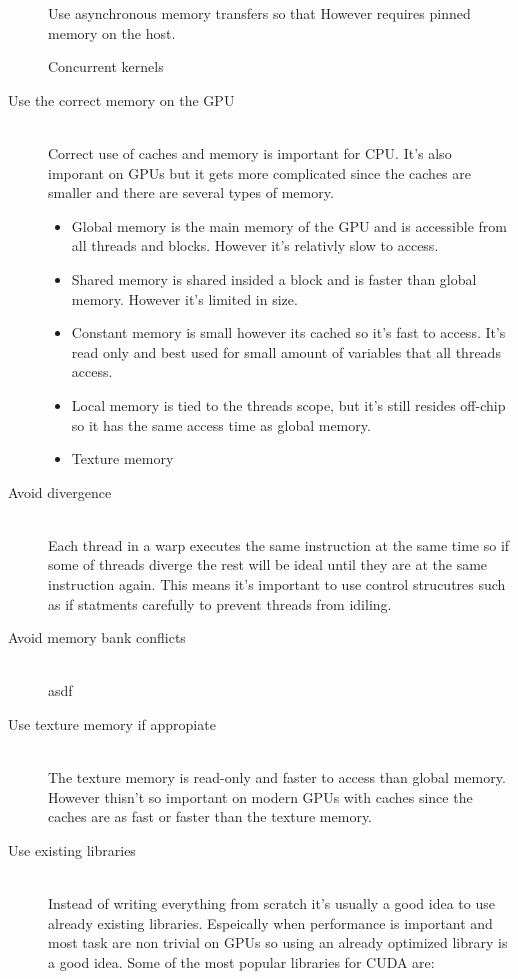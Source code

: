 \documentclass[10pt,a4paper]{article}
\begin{document}
\begin{description}
  Use asynchronous memory transfers so that
  However requires pinned memory on the host.
  
  Concurrent kernels
  
  
  
  \item[Use the correct memory on the GPU] \hfill \\
  Correct use of caches and memory is important for CPU\cite{drepper2007cpumemory}. It's also imporant on GPUs but it gets more complicated since the caches are smaller and there are several types of memory.
    \begin{itemize}
    \item Global memory is the main memory of the GPU and is accessible from all threads and blocks. However it's relativly slow to access.
    \item Shared memory is shared insided a block and is faster than global memory. However it's limited in size.
    \item Constant memory is small however its cached so it's fast to access. It's read only and best used for small amount of variables that all threads access.
    \item Local memory is tied to the threads scope, but it's still resides off-chip so it has the same access time as global memory.
    \item Texture memory %
  \end{itemize}
  \item[Avoid divergence] \hfill \\
  Each thread in a warp executes the same instruction at the same time so if some of threads diverge the rest will be ideal until they are at the same instruction again. This means it's important to use control strucutres such as if statments carefully to prevent threads from idiling.\cite{cuda, cuda_best_practice}
  \item[Avoid memory bank conflicts] \hfill \\
  asdf %
  \item[Use texture memory if appropiate] \hfill \\
  The texture memory is read-only and faster to access than global memory. However thisn't so important on modern GPUs with caches since the caches are as fast or faster than the texture memory.\cite{plink_gpu, cuda}
  \item[Use existing libraries] \hfill \\
  Instead of writing everything from scratch it's usually a good idea to use already existing libraries. Espeically when performance is important and most task are non trivial on GPUs so using an already optimized library is a good idea. Some of the most popular libraries for CUDA are:

\end{description}
\end{document}
